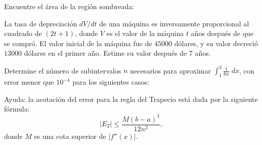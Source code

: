 \documentclass{exam}
\begin{document}
\begin{questions}
    \question [1]
    Encuentre el área de la región sombreada:
    
    \question [1]
    La tasa de depreciación $dV/dt$ de una máquina es inversamente proporcional al cuadrado de $(2t+1)$, donde $V$ es el valor de la máquina $t$ años después de que se compró. El valor inicial de la máquina fue de $45000$ dólares, y su valor decreció $13000$ dólares en el primer año. Estime su valor después de 7 años.
		
	\question [1]
	Determine el número de subintervalos $n$ necesarios para aproximar $\displaystyle \int_1^2\frac{1}{6x} \; dx$, con error menor que $10^{-4}$ para los siguientes casos:
	Ayuda: la acotación del error para la regla del Trapecio está dada por la siguiente fórmula:
	$$
	|E_T| \leq \frac{M(b-a) ^3}{12n^2},%
	$$
	donde $M$ es una cota superior de $|f''(x)|$. 
	\end{questions}		
\end{document}
